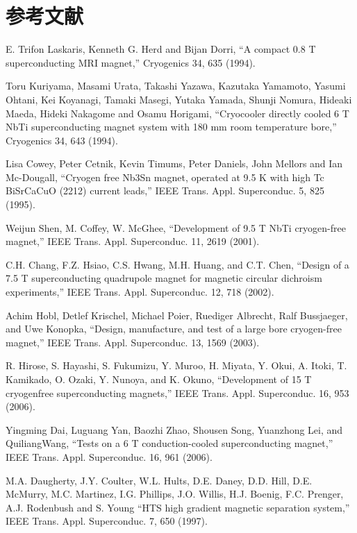 \section*{参考文献}
\noindent [4.1] E. Trifon Laskaris, Kenneth G. Herd and Bijan Dorri, ``A compact 0.8 T superconducting MRI magnet,” Cryogenics 34, 635 (1994).

\noindent [4.2] Toru Kuriyama, Masami Urata, Takashi Yazawa, Kazutaka Yamamoto, Yasumi
Ohtani, Kei Koyanagi, Tamaki Masegi, Yutaka Yamada, Shunji Nomura, Hideaki
Maeda, Hideki Nakagome and Osamu Horigami, ``Cryocooler directly cooled 6
T NbTi superconducting magnet system with 180 mm room temperature bore,”
Cryogenics 34, 643 (1994).

\noindent [4.3] Lisa Cowey, Peter Cetnik, Kevin Timums, Peter Daniels, John Mellors and Ian Mc-Dougall, ``Cryogen free Nb3Sn magnet, operated at 9.5 K with high Tc BiSrCaCuO
(2212) current leads,” IEEE Trans. Appl. Superconduc. 5, 825 (1995).

\noindent [4.4] Weijun Shen, M. Coffey, W. McGhee, ``Development of 9.5 T NbTi cryogen-free
magnet,” IEEE Trans. Appl. Superconduc. 11, 2619 (2001).

\noindent [4.5] C.H. Chang, F.Z. Hsiao, C.S. Hwang, M.H. Huang, and C.T. Chen, ``Design of a
7.5 T superconducting quadrupole magnet for magnetic circular dichroism experiments,”
IEEE Trans. Appl. Superconduc. 12, 718 (2002).

\noindent [4.6] Achim Hobl, Detlef Krischel, Michael Poier, Ruediger Albrecht, Ralf Bussjaeger,
and Uwe Konopka, ``Design, manufacture, and test of a large bore cryogen-free
magnet,” IEEE Trans. Appl. Superconduc. 13, 1569 (2003).

\noindent [4.7] R. Hirose, S. Hayashi, S. Fukumizu, Y. Muroo, H. Miyata, Y. Okui, A. Itoki,
T. Kamikado, O. Ozaki, Y. Nunoya, and K. Okuno, ``Development of 15 T cryogenfree
superconducting magnets,” IEEE Trans. Appl. Superconduc. 16, 953 (2006).

\noindent [4.8] Yingming Dai, Luguang Yan, Baozhi Zhao, Shousen Song, Yuanzhong Lei, and
QuiliangWang, ``Tests on a 6 T conduction-cooled superconducting magnet,” IEEE
Trans. Appl. Superconduc. 16, 961 (2006).

\noindent [4.9] M.A. Daugherty, J.Y. Coulter, W.L. Hults, D.E. Daney, D.D. Hill, D.E. McMurry,
M.C. Martinez, I.G. Phillips, J.O. Willis, H.J. Boenig, F.C. Prenger, A.J. Rodenbush
and S. Young ``HTS high gradient magnetic separation system,” IEEE Trans.
Appl. Superconduc. 7, 650 (1997).

